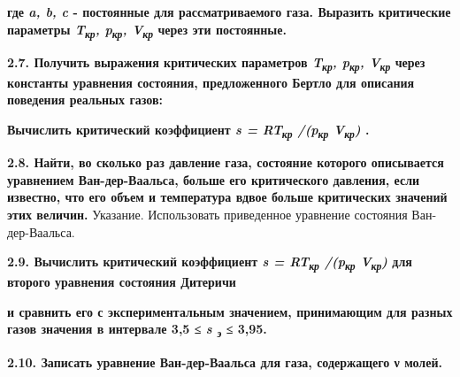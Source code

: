 
\textbf{где \emph{a, b, c} - постоянные для рассматриваемого газа.
Выразить критические параметры \emph{T\textsubscript{кр},
p\textsubscript{кр}, V\textsubscript{кр}} через эти постоянные.}

\textbf{2.7. Получить выражения критических параметров
\emph{T\textsubscript{кр}, p\textsubscript{кр}, V\textsubscript{кр}}
через константы уравнения состояния, предложенного Бертло для описания
поведения реальных газов:}


\textbf{Вычислить критический коэффициент \emph{s = RT\textsubscript{кр}
/(p\textsubscript{кр} V\textsubscript{кр})} .}

\textbf{2.8. Найти, во сколько раз давление газа, состояние которого
описывается уравнением Ван-дер-Ваальса, больше его критического
давления, если известно, что его объем и температура вдвое больше
критических значений этих величин.} Указание. Использовать приведенное
уравнение состояния Ван-дер-Ваальса.

\textbf{2.9. Вычислить критический коэффициент \emph{s =
RT\textsubscript{кр} /(p\textsubscript{кр} V\textsubscript{кр})} для
второго уравнения состояния Дитеричи}


\textbf{и сравнить его с экспериментальным значением, принимающим для
разных газов значения в интервале 3,5 ≤ \emph{s \textsubscript{э}} ≤
3,95.}

\textbf{2.10. Записать уравнение Ван-дер-Ваальса для газа, содержащего ν
молей.}
